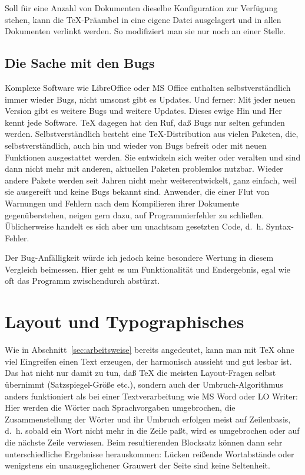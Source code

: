 \documentclass[11pt,a4paper,ngerman,DIV=8]{scrartcl}
\begin{document}
Soll für eine Anzahl von Dokumenten dieselbe Konfiguration zur Verfügung stehen, kann die \TeX{}-Präambel in eine eigene Datei ausgelagert und in allen Dokumenten verlinkt werden. So modifiziert man sie nur noch an einer Stelle.

\subsection{Die Sache mit den Bugs}

Komplexe Software wie LibreOffice oder MS Office enthalten selbstverständlich immer wieder Bugs, nicht umsonst gibt es Updates. Und ferner: Mit jeder neuen Version gibt es weitere Bugs und weitere Updates. Dieses ewige Hin und Her kennt jede Software. \TeX{} dagegen hat den Ruf, daß Bugs nur selten gefunden werden. Selbstverständlich besteht eine \TeX{}-Distribution aus vielen Paketen, die, selbstverständlich, auch hin und wieder von Bugs befreit oder mit neuen Funktionen ausgestattet werden. Sie entwickeln sich weiter oder veralten und sind dann nicht mehr mit anderen, aktuellen Paketen problemlos nutzbar. Wieder andere Pakete werden seit Jahren nicht mehr weiterentwickelt, ganz einfach, weil sie ausgereift und keine Bugs bekannt sind. Anwender, die einer Flut von Warnungen und Fehlern nach dem Kompilieren ihrer Dokumente gegenüberstehen, neigen gern dazu, auf Programmierfehler zu schließen. Üblicherweise handelt es sich aber um unachtsam gesetzten Code, d.~h. Syntax-Fehler.

Der Bug-Anfälligkeit würde ich jedoch keine besondere Wertung in diesem Vergleich beimessen. Hier geht es um Funktionalität und Endergebnis, egal wie oft das Programm zwischendurch abstürzt.

\section{Layout und Typographisches}\label{sec:layout}

Wie in Abschnitt~\ref{sec:arbeitsweise} bereits angedeutet, kann man mit \TeX{} ohne viel Eingreifen einen Text erzeugen, der harmonisch aussieht und gut lesbar ist. Das hat nicht nur damit zu tun, daß \TeX{} die meisten Layout-Fragen selbst übernimmt (Satzspiegel-Größe etc.), sondern auch der Umbruch-Algorithmus anders funktioniert als bei einer Textverarbeitung wie MS Word oder LO Writer: Hier werden die Wörter nach Sprachvorgaben umgebrochen, die Zusammenstellung der Wörter und ihr Umbruch erfolgen meist auf Zeilenbasis, d.~h. sobald ein Wort nicht mehr in die Zeile paßt, wird es umgebrochen oder auf die nächste Zeile verwiesen. Beim resultierenden Blocksatz können dann sehr unterschiedliche Ergebnisse herauskommen: Lücken reißende Wortabstände oder wenigstens ein unausgeglichener Grauwert der Seite sind keine Seltenheit.
\end{document}
